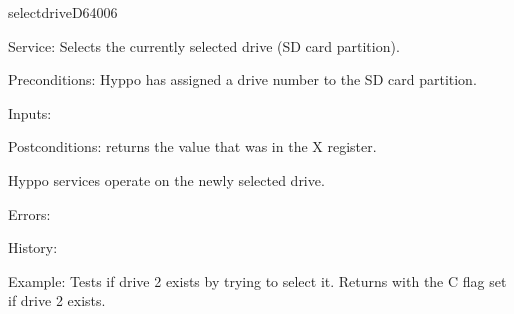 \newpage
\begin{hyppotrap}{selectdrive}{D640}{06}
\item [Service:]
  Selects the currently selected drive (SD card partition).
\item [Preconditions:]
  Hyppo has assigned a drive number to the SD card partition.
\item [Inputs:]
\item [Postconditions:]
   returns the value that was in the X register.

  Hyppo services operate on the newly selected drive.
\item [Errors:]
\item [History:]
\item [Example:]
  Tests if drive 2 exists by trying to select it. Returns with the C flag set if
  drive 2 exists.
\end{hyppotrap}



